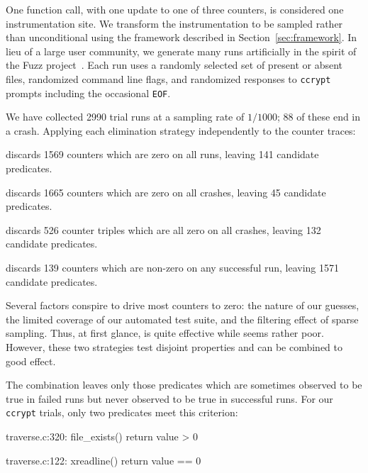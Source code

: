 One function call, with one update to one of three counters, is considered one
instrumentation site.  We transform the instrumentation to be sampled
rather than unconditional using the framework described in
Section~\ref{sec:framework}.  In lieu of a large user community, we
generate many runs artificially in the spirit of the Fuzz
project~\cite{MKLMMNS95}.  Each run uses a randomly selected set of
present or absent files, randomized command line flags, and randomized
responses to \texttt{ccrypt} prompts including the occasional
\texttt{EOF}.

We have collected 2990 trial runs at a sampling rate of $1/1000$; 88
of these end in a crash.  Applying each elimination strategy
independently to the counter traces:

\begin{description}\sloppy
\item[\elim{Universal falsehood}] discards 1569 counters which are
  zero on all runs, leaving 141 candidate predicates.

\item[\elim{Lack of failing example}] discards 1665 counters which are
  zero on all crashes, leaving 45 candidate predicates.

\item[\elim{Lack of failing coverage}] discards 526 counter triples
  which are all zero on all crashes, leaving 132 candidate predicates.

\item[\elim{Successful counterexample}] discards 139 counters which
  are non-zero on any successful run, leaving 1571 candidate
  predicates.
\end{description}

Several factors conspire to drive most counters to zero: the \naive
nature of our guesses, the limited coverage of our automated test
suite, and the filtering effect of sparse sampling.  Thus, at first
glance,  is quite effective
while  seems rather
poor.  However, these two strategies test disjoint properties and can
be combined to good effect.

The combination leaves only those predicates which are sometimes
observed to be true in failed runs but never observed to be true in
successful runs.  For our \texttt{ccrypt} trials, only two
predicates meet this criterion:

\begin{features}
\item traverse.c:320: file\_exists() return value > 0
\item traverse.c:122: xreadline() return value == 0
\end{features}

